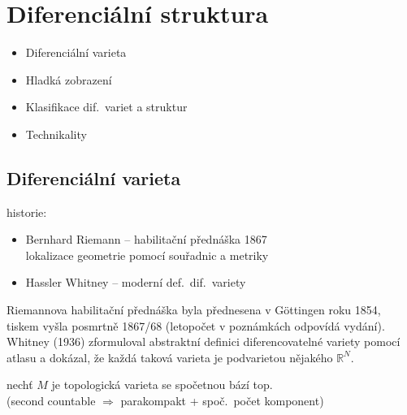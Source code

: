 \section{Diferenciální struktura}

\begin{itemize}[nosep]
  \item Diferenciální varieta
  \item Hladká zobrazení
  \item Klasifikace dif.\ variet a struktur
  \item Technikality
\end{itemize}

\subsection{Diferenciální varieta}

historie:
\begin{itemize}[nosep]
  \item[] Bernhard Riemann -- habilitační přednáška 1867 \\
          \quad lokalizace geometrie pomocí souřadnic a metriky
  \item[] Hassler Whitney -- moderní def.\ dif.\ variety
\end{itemize}

\begin{vysvetleni}[Historie]
Riemannova habilitační přednáška  byla přednesena v Göttingen roku 1854, tiskem vyšla posmrtně 1867/68 (letopočet v poznámkách odpovídá vydání). Whitney (1936) zformuloval abstraktní definici diferencovatelné variety pomocí atlasu a dokázal, že každá taková varieta je podvarietou nějakého $\mathbb{R}^N$.
\end{vysvetleni}

nechť $M$ je topologická varieta se spočetnou bází top. \\
\quad (second countable $\Rightarrow$ parakompakt + spoč.\ počet komponent)

